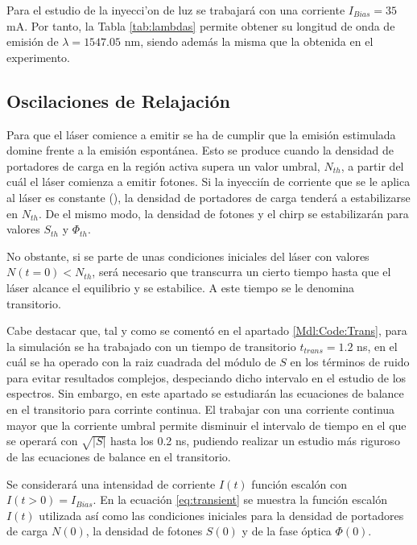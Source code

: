 			Para el estudio de la inyecci'on de luz se trabajar\'a con una corriente $I_{Bias} = 35$ mA. Por tanto, la Tabla \ref{tab:lambdas} permite obtener su longitud de onda de emisi\'on de $\lambda = 1547.05$ nm, siendo adem\'as la misma que la obtenida en el experimento.
	
		\subsection{Oscilaciones de Relajaci\'on}

			Para que el l\'aser comience a emitir se ha de cumplir que la emisi\'on estimulada domine frente a la emisi\'on espont\'anea. Esto se produce cuando la densidad de portadores de carga en la regi\'on activa supera un valor umbral, $N_{th}$, a partir del cu\'al el l\'aser comienza a emitir fotones. Si la inyecci\'in de corriente que se le aplica al l\'aser es constante (\cw), la densidad de portadores de carga tender\'a a estabilizarse en $N_{th}$. De el mismo modo, la densidad de fotones y el chirp se estabilizar\'an para valores $S_{th}$ y $\Phi_{th}$.

			No obstante, si se parte de unas condiciones iniciales del l\'aser con valores $N(t=0) < N_{th}$, ser\'a necesario que transcurra un cierto tiempo hasta que el l\'aser alcance el equilibrio y se estabilice. A este tiempo se le denomina transitorio.

			Cabe destacar que, tal y como se coment\'o en el apartado \ref{Mdl:Code:Trans}, para la simulación se ha trabajado con un tiempo de transitorio $t_{trans} = 1.2$ ns, en el cu\'al se ha operado con la raiz cuadrada del m\'odulo de $S$ en los t\'erminos de ruido para evitar resultados complejos, despeciando dicho intervalo en el estudio de los espectros. Sin embargo, en este apartado se estudiar\'an las ecuaciones de balance en el transitorio para corrinte continua. El trabajar con una corriente continua mayor que la corriente umbral permite disminuir el intervalo de tiempo en el que se operar\'a con $\sqrt{|S|}$ hasta los 0.2 ns, pudiendo realizar un estudio m\'as riguroso de las ecuaciones de balance en el transitorio.

			Se considerar\'a una intensidad de corriente $I(t)$ funci\'on escal\'on con $I(t>0) = I_{Bias}$. En la ecuaci\'on \ref{eq:transient} se muestra la funci\'on escal\'on $I(t)$ utilizada as\'i como las condiciones iniciales para la densidad de portadores de carga $N(0)$, la densidad de fotones $S(0)$ y de la fase \'optica $\Phi(0)$.

